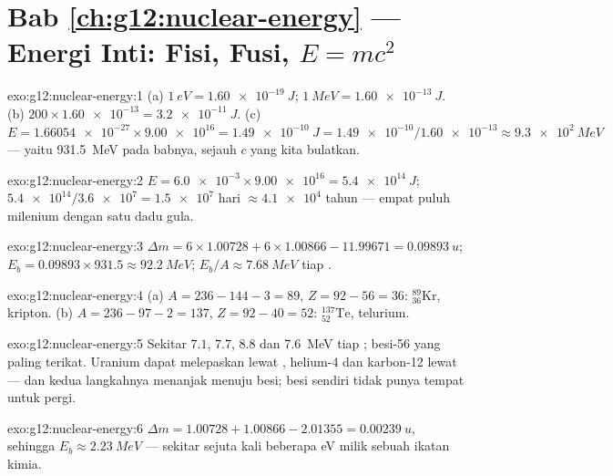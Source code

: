 \section*{Bab \ref{ch:g12:nuclear-energy} --- Energi Inti: Fisi, Fusi, $E=mc^2$}

\begin{solution}{exo:g12:nuclear-energy:1}
(a) $\qty{1}{eV} = \qty{1.60e-19}{J}$;
$\qty{1}{MeV} = \qty{1.60e-13}{J}$.
(b) $200 \times \num{1.60e-13} = \qty{3.2e-11}{J}$.
(c) $E = \num{1.66054e-27} \times \num{9.00e16} = \qty{1.49e-10}{J}
= \num{1.49e-10}/\num{1.60e-13} \approx \qty{9.3e2}{MeV}$ --- yaitu
\qty{931.5}{MeV} pada babnya, sejauh $c$ yang kita bulatkan.
\end{solution}

\begin{solution}{exo:g12:nuclear-energy:2}
$E = \num{6.0e-3} \times \num{9.00e16} = \qty{5.4e14}{J}$;
$\num{5.4e14}/\num{3.6e7} = \num{1.5e7}$ hari $\approx \num{4.1e4}$
tahun --- empat puluh milenium dengan satu dadu gula.
\end{solution}

\begin{solution}{exo:g12:nuclear-energy:3}
$\Delta m = 6 \times 1.00728 + 6 \times 1.00866 - 11.99671 =
\qty{0.09893}{u}$; $E_b = 0.09893 \times 931.5 \approx \qty{92.2}{MeV}$;
$E_b/A \approx \qty{7.68}{MeV}$ tiap .
\end{solution}

\begin{solution}{exo:g12:nuclear-energy:4}
(a) $A = 236 - 144 - 3 = 89$, $Z = 92 - 56 = 36$:
${}^{89}_{36}\mathrm{Kr}$, kripton.
(b) $A = 236 - 97 - 2 = 137$, $Z = 92 - 40 = 52$:
${}^{137}_{52}\mathrm{Te}$, telurium.
\end{solution}

\begin{solution}{exo:g12:nuclear-energy:5}
Sekitar $7.1$, $7.7$, $8.8$ dan \qty{7.6}{MeV} tiap ; besi-56
yang paling terikat. Uranium dapat melepaskan  lewat , helium-4 dan
karbon-12 lewat  --- dan kedua langkahnya menanjak menuju besi;
besi sendiri tidak punya tempat untuk pergi.
\end{solution}

\begin{solution}{exo:g12:nuclear-energy:6}
$\Delta m = 1.00728 + 1.00866 - 2.01355 = \qty{0.00239}{u}$, sehingga
$E_b \approx \qty{2.23}{MeV}$ --- sekitar sejuta kali beberapa
\unit{eV} milik sebuah ikatan kimia.
\end{solution}

